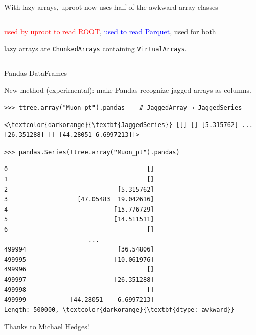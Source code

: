 \documentclass[aspectratio=169]{beamer}
\begin{document}
\begin{frame}{With lazy arrays, uproot now uses half of the awkward-array classes}
\begin{columns}
\vspace{-0.25 cm}
\begin{center}
\begin{minipage}{0.63\linewidth}
\small
\textcolor{red}{used by uproot to read ROOT}, \textcolor{blue}{used to read Parquet}, \textcolor{mauve}{used for both}

lazy arrays are \texttt{ChunkedArrays} containing \texttt{VirtualArrays}.
\end{minipage}
\end{center}
\end{columns}
\end{frame}

\begin{frame}[fragile]{Pandas DataFrames}
\large
\vspace{0.25 cm}

New method (experimental): make Pandas recognize jagged arrays as columns.

\small
\begin{verbatim}
>>> ttree.array("Muon_pt").pandas    # JaggedArray → JaggedSeries
\end{verbatim}
\scriptsize\color{darkblue}\vspace{-0.75\baselineskip}\begin{Verbatim}[commandchars=\\\{\}]
<\textcolor{darkorange}{\textbf{JaggedSeries}} [[] [] [5.315762] ... [26.351288] [] [44.28051 6.6997213]]>
\end{Verbatim}
\color{black}

\small
\begin{verbatim}
>>> pandas.Series(ttree.array("Muon_pt").pandas)
\end{verbatim}
\scriptsize\color{darkblue}\vspace{-0.75\baselineskip}\begin{Verbatim}[commandchars=\\\{\}]
0                                      []
1                                      []
2                              [5.315762]
3                   [47.05483  19.042616]
4                             [15.776729]
5                             [14.511511]
6                                      []
                       ...               
499994                         [36.54806]
499995                        [10.061976]
499996                                 []
499997                        [26.351288]
499998                                 []
499999            [44.28051    6.6997213]
Length: 500000, \textcolor{darkorange}{\textbf{dtype: awkward}}
\end{Verbatim}
\color{black}
\large

\vspace{-3 cm}
\hfill \begin{minipage}{0.35\linewidth}
Thanks to Michael Hedges!
\end{minipage}
\vspace{3 cm}
\end{frame}
\end{document}
